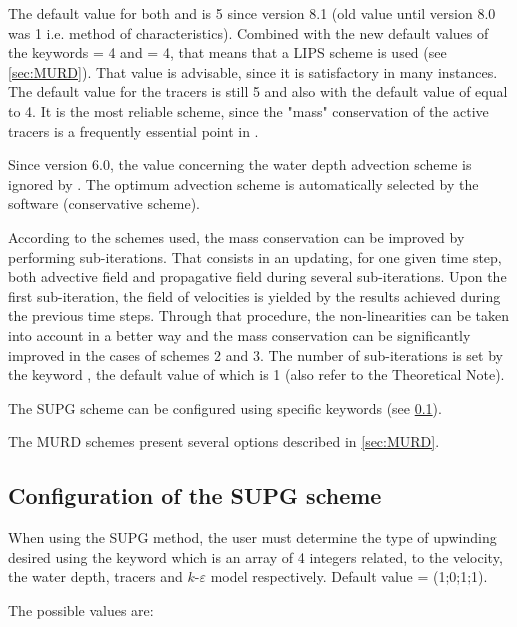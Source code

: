 The default value for both
 and
is 5 since version 8.1
(old value until version 8.0 was 1 i.e. method of characteristics). 
Combined with the new default values of the keywords
 = 4
and  = 4,
that means that a LIPS scheme is used (see \ref{sec:MURD}).
That value is advisable, since it is satisfactory in many instances.
The default value for the tracers is still 5 and also with the default value of
 equal to 4. It is the
most reliable scheme, since the "mass" conservation of the active tracers is a
frequently essential point in .

Since version 6.0, the value concerning the water depth advection scheme is
ignored by . The optimum advection scheme is automatically selected
by the software (conservative scheme).

According to the schemes used, the mass conservation can be improved by
performing sub-iterations. That consists in an updating, for one given time
step, both advective field and propagative field during several sub-iterations.
Upon the first sub-iteration, the field of velocities is yielded by the results
achieved during the previous time steps. Through that procedure, the
non-linearities can be taken into account in a better way and the mass
conservation can be significantly improved in the cases of schemes 2 and 3. The
number of sub-iterations is set by the keyword , the default value of which is 1 (also refer to the
Theoretical Note).

The SUPG scheme can be configured using specific keywords (see \ref{sec:supg}).

The MURD schemes present several options described in \ref{sec:MURD}.

\subsection{Configuration of the SUPG scheme}
\label{sec:supg}
When using the SUPG method, the user must determine the type of upwinding
desired using the keyword  which is an array of
4 integers related, to the velocity, the water depth, tracers and
$k$-$\varepsilon $ model respectively.
Default value = (1;0;1;1).

The possible values are:

